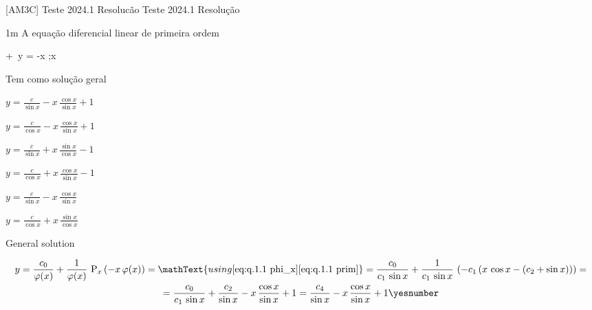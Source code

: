 \documentclass["AM3C-tests_resolutions.tex"]{subfiles}
\begin{document}

[AM3C]
{Teste 2024.1 Resolucão} %
{Teste 2024.1 Resolução} %

\group{}

\begin{questionBox}1m{} %
  A equação diferencial linear de primeira ordem
  \begin{BM}
     + \,y
    = -x
    ;\quad x \in {}
  \end{BM}
  Tem como solução geral
  \begin{itemize}[label=\Box]
    \begin{multicols}{3}
      \item[\blacksquare] \(y = \frac{c}{\sin x} - x\,\frac{\cos x}{\sin x} +1\)
      \item \(y = \frac{c}{\cos x} - x\,\frac{\cos x}{\sin x} +1\)
      \item \(y = \frac{c}{\sin x} + x\,\frac{\sin x}{\cos x} -1\)
      \item \(y = \frac{c}{\cos x} + x\,\frac{\cos x}{\sin x} -1\)
      \item \(y = \frac{c}{\sin x} - x\,\frac{\cos x}{\sin x}\)
      \item \(y = \frac{c}{\cos x} + x\,\frac{\sin x}{\cos x}\)
    \end{multicols}
  \end{itemize}


  \answer{\eqref{eq:q.1.1 answer}}

  General solution
  \begin{tcolorbox}
    \begin{gather*}
      y
      = \frac{c_0}{\varphi(x)}
      + \frac{1  }{\varphi(x)}
      \,\prim_x{\left(
          -x\,\varphi(x)
      \right)}
      = \mathText{using 
        \eqref{eq:q.1.1 phi_x}
        \eqref{eq:q.1.1 prim}
      }
      = \frac{c_0}{ c_1\,\sin{x} }
      + \frac{1  }{ c_1\,\sin{x} }
      \,\left(
        -c_1\,(
          x\,\cos{x} - (c_2+\sin{x})
        )
      \right)
      = \\
      = \frac{c_0}{c_1\,\sin{x}}
      + \frac{c_2}{\sin{x}}
      - x\,\frac{\cos{x}}{\sin{x}}
      + 1
      = \frac{c_4}{\sin{x}}
      - x\,\frac{\cos{x}}{\sin{x}}
      + 1
      \yesnumber\label{eq:q.1.1 answer}
    \end{gather*}
  \end{tcolorbox}


\end{questionBox}
\end{document}

